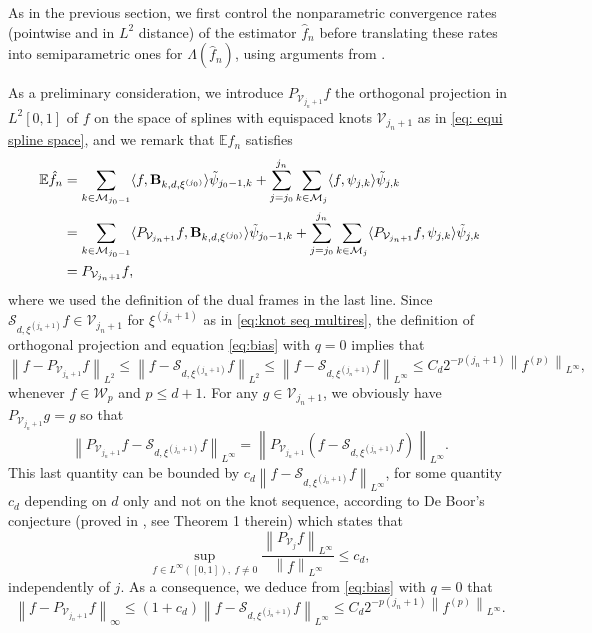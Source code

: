 \documentclass[preprint]{imsart}
\newcommand{\E}{{\mathbb E}}
\newcommand\norm[1]{\left\lVert#1\right\rVert}
\numberwithin{equation}{section}
\begin{document}
\begin{appendix}
As in the previous section, we first control the nonparametric convergence rates (pointwise and in $L^2$ distance) of the estimator $\hat{f}_n$ before translating these rates into semiparametric ones for $\Lambda(\hat{f}_n)$, using arguments from \cite{GoldsteinMesser92}.

As a preliminary consideration, we introduce $P_{\mathcal{V}_{j_n+1}}f$ the orthogonal projection in $L^2[0,1]$ of $f$ on the space of splines with equispaced knots $\mathcal{V}_{j_n+1}$ as in \eqref{eq: equi spline space}, and we remark that $\E\hat{f}_n$ satisfies
\begin{align*} 
\E\hat{f}_n&= \sum_{k\in\mathcal{M}_{j_0-1}} \langle f , \mathbf{B}_{k,d,\xi^{(j_0)}}\rangle \Tilde{\psi}_{j_0-1,k}  + \sum_{j=j_0}^{j_n}\sum_{k\in\mathcal{M}_{j}} \langle f , \psi_{j,k}\rangle \Tilde{\psi}_{j,k}\\
&= \sum_{k\in\mathcal{M}_{j_0-1}} \langle P_{\mathcal{V}_{j_n+1}}f , \mathbf{B}_{k,d,\xi^{(j_0)}}\rangle \Tilde{\psi}_{j_0-1,k} + \sum_{j=j_0}^{j_n}\sum_{k\in\mathcal{M}_{j}} \langle P_{\mathcal{V}_{j_n+1}}f , \psi_{j,k}\rangle \Tilde{\psi}_{j,k}\\
&= P_{\mathcal{V}_{j_n+1}}f,
\end{align*}
where we used the definition of the dual frames in the last line. Since $\mathcal{S}_{d,\xi^{(j_n+1)}}f\in \mathcal{V}_{j_n+1}$ for $\xi^{(j_n+1)}$ as in \eqref{eq:knot seq multires}, the definition of orthogonal projection and equation \eqref{eq:bias} with $q=0$ implies that
\begin{equation}\label{eq: L2 bias proj spline}
    \norm{f-P_{\mathcal{V}_{j_n+1}}f}_{L^2} \leq \norm{f-\mathcal{S}_{d,\xi^{(j_n+1)}}f}_{L^2} \leq \norm{f-\mathcal{S}_{d,\xi^{(j_n+1)}}f}_{L^\infty} \leq C_d 2^{-p(j_n+1)} \norm{f^{(p)}}_{L^\infty},
\end{equation}
whenever $f\in \mathcal{W}_{p}$ and $p\leq d+1$. For any $g\in \mathcal{V}_{j_n+1}$, we obviously have $P_{\mathcal{V}_{j_n+1}}g=g$ so that 
\[\norm{P_{\mathcal{V}_{j_n+1}}f - \mathcal{S}_{d,\xi^{(j_n+1)}}f}_{L^\infty} = \norm{P_{\mathcal{V}_{j_n+1}}(f - \mathcal{S}_{d,\xi^{(j_n+1)}}f)}_{L^\infty}.\]
This last quantity can be bounded by $c_d \norm{f - \mathcal{S}_{d,\xi^{(j_n+1)}}f}_{L^\infty}$, for some quantity $c_d$ depending on $d$ only and not on the knot sequence, according to De Boor's conjecture (proved in \cite{Shadrin2001}, see Theorem 1 therein) which states that
\[\sup_{f\in L^\infty([0,1]),\ f\neq 0}\frac{\norm{P_{\mathcal{V}_j}f}_{L^\infty}}{\norm{f}_{L^\infty}} \leq c_d,\]
independently of $j$. As a consequence, we deduce from \eqref{eq:bias} with $q=0$ that
\begin{equation}\label{eq: supnorm bias proj spline}
    \norm{f-P_{\mathcal{V}_{j_n+1}}f}_{\infty} \leq (1+c_d)\norm{f-\mathcal{S}_{d,\xi^{(j_n+1)}}f}_{L^\infty} \leq C_d 2^{-p(j_n+1)} \norm{f^{(p)}}_{L^\infty}.
\end{equation}




\end{appendix}
\end{document}
